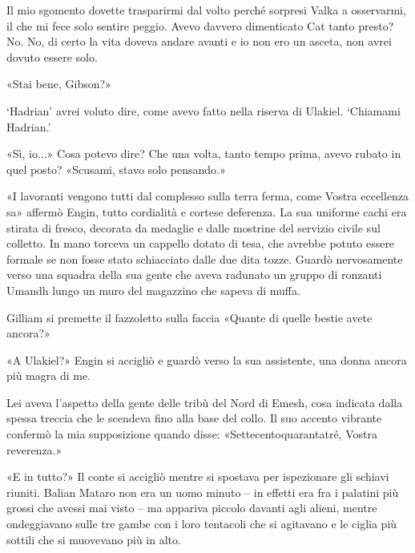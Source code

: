 Il mio sgomento dovette trasparirmi dal volto perché sorpresi Valka a
osservarmi, il che mi fece solo sentire peggio. Avevo davvero
dimenticato Cat tanto presto? No. No, di certo la vita doveva andare
avanti e io non ero un asceta, non avrei dovuto essere solo.

«Stai bene, Gibson?»

`Hadrian' avrei voluto dire, come avevo fatto nella riserva di Ulakiel.
`Chiamami Hadrian.'

«Sì, io...» Cosa potevo dire? Che una volta, tanto tempo prima, avevo
rubato in quel posto? «Scusami, stavo solo pensando.»

«I lavoranti vengono tutti dal complesso sulla terra ferma, come Vostra
eccellenza sa» affermò Engin, tutto cordialità e cortese deferenza. La
sua uniforme cachi era stirata di fresco, decorata da medaglie e dalle
mostrine del servizio civile sul colletto. In mano torceva un cappello
dotato di tesa, che avrebbe potuto essere formale se non fosse stato
schiacciato dalle due dita tozze. Guardò nervosamente verso una squadra
della sua gente che aveva radunato un gruppo di ronzanti Umandh lungo un
muro del magazzino che sapeva di muffa.

Gilliam si premette il fazzoletto sulla faccia «Quante di quelle bestie
avete ancora?»

«A Ulakiel?» Engin si accigliò e guardò verso la sua assistente, una
donna ancora più magra di me.

Lei aveva l'aspetto della gente delle tribù del Nord di Emesh, cosa
indicata dalla spessa treccia che le scendeva fino alla base del collo.
Il suo accento vibrante confermò la mia supposizione quando disse:
«Settecentoquarantatré, Vostra reverenza.»

«E in tutto?» Il conte si accigliò mentre si spostava per ispezionare
gli schiavi riuniti. Balian Mataro non era un uomo minuto -- in effetti
era fra i palatini più grossi che avessi mai visto -- ma appariva
piccolo davanti agli alieni, mentre ondeggiavano sulle tre gambe con i
loro tentacoli che si agitavano e le ciglia più sottili che si muovevano
più in alto.


